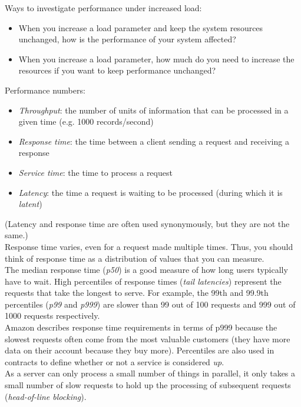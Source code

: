\documentclass[12pt, titlepage]{article}
\begin{document}
Ways to investigate performance under increased load:

\begin{itemize}
    \item When you increase a load parameter and keep the system resources unchanged, how is the performance of your system affected?
    \item When you increase a load parameter, how much do you need to increase the resources if you want to keep performance unchanged?
\end{itemize}

Performance numbers:
\begin{itemize}
    \item \textit{Throughput}: the number of units of information that can be processed in a given time (e.g. 1000 records/second)
    \item \textit{Response time}: the time between a client sending a request and receiving a response
    \item \textit{Service time}: the time to process a request
    \item \textit{Latency}: the time a request is waiting to be processed (during which it is \textit{latent})
\end{itemize}

(Latency and response time are often used synonymously, but they are not the same.) \\

Response time varies, even for a request made multiple times. Thus, you should think of response time as a distribution of values that you can measure. \\

The median response time (\textit{p50}) is a good measure of how long users typically have to wait. High percentiles of response times (\textit{tail latencies}) represent the requests that take the longest to serve. For example, the 99th and 99.9th percentiles (\textit{p99} and \textit{p999}) are slower than 99 out of 100 requests and 999 out of 1000 requests respectively. \\

Amazon describes response time requirements in terms of p999 because the slowest requests often come from the most valuable customers (they have more data on their account because they buy more). Percentiles are also used in contracts to define whether or not a service is considered \textit{up}. \\

As a server can only process a small number of things in parallel, it only takes a small number of slow requests to hold up the processing of subsequent requests (\textit{head-of-line blocking}). \\
\end{document}
